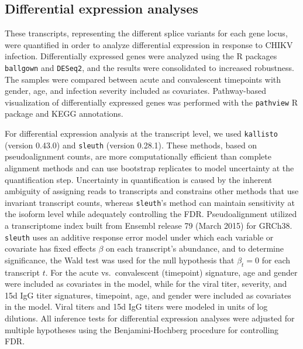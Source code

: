 \subsection{Differential expression analyses}

These transcripts, representing the different splice variants for each gene locus, were quantified in order to analyze differential expression in response to CHIKV infection. Differentially expressed genes were analyzed using the R packages \texttt{ballgown}\autocite{Frazee2014,Pertea2016} and \texttt{DESeq2},\autocite{Anders2010} and the results were consolidated to increased robustness. The samples were compared between acute and convalescent timepoints with gender, age, and infection severity included as covariates. Pathway-based visualization of differentially expressed genes was performed with the \texttt{pathview}\autocite{Luo2013} R package and KEGG\autocite{Ogata1999} annotations.

For differential expression analysis at the transcript level, we used \texttt{kallisto}\autocite{Bray2016} (version 0.43.0) and \texttt{sleuth}\autocite{Pimentel2016} (version 0.28.1). These methods, based on pseudoalignment counts, are more computationally efficient than complete alignment methods and can use bootstrap replicates to model uncertainty at the quantification step.\autocite{Bray2016} Uncertainty in quantification is caused by the inherent ambiguity of assigning reads to transcripts and constrains other methods that use invariant transcript counts, whereas \texttt{sleuth}’s method can maintain sensitivity at the isoform level while adequately controlling the FDR.\autocite{Pimentel2016} Pseudoalignment utilized a transcriptome index built from Ensembl release 79 (March 2015) for GRCh38. \texttt{sleuth} uses an additive response error model under which each variable or covariate has fixed effects $\beta$ on each transcript’s abundance, and to determine significance, the Wald test was used for the null hypothesis that $\beta_t = 0$ for each transcript $t$. For the acute vs.\ convalescent (timepoint) signature, age and gender were included as covariates in the model, while for the viral titer, severity, and 15d IgG titer signatures, timepoint, age, and gender were included as covariates in the model. Viral titers and 15d IgG titers were modeled in units of log dilutions. All inference tests for differential expression analyses were adjusted for multiple hypotheses using the Benjamini-Hochberg procedure for controlling FDR.\autocite{Benjamini2001}

